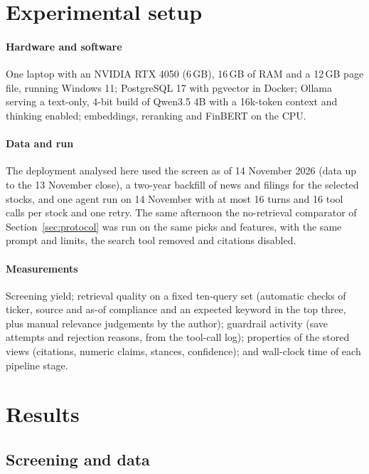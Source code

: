 \documentclass[preprint,11pt]{elsarticle}
\begin{document}
\section{Experimental setup}
\label{sec:setup}

\paragraph{Hardware and software} One laptop with an NVIDIA RTX 4050 (6\,GB), 16\,GB of RAM and a 12\,GB page
file, running Windows 11; PostgreSQL 17 with pgvector in Docker; Ollama serving a text-only, 4-bit build of
Qwen3.5 4B with a 16k-token context and thinking enabled; embeddings, reranking and FinBERT on the CPU.

\paragraph{Data and run} The deployment analysed here used the screen as of 14 November 2026 (data up to the
13 November close), a two-year backfill of news and filings for the selected stocks, and one agent run on
14 November with at most 16 turns and 16 tool calls per stock and one retry. The same afternoon the
no-retrieval comparator of Section~\ref{sec:protocol} was run on the same picks and features, with the same
prompt and limits, the search tool removed and citations disabled.

\paragraph{Measurements} Screening yield; retrieval quality on a fixed ten-query set (automatic checks of
ticker, source and as-of compliance and an expected keyword in the top three, plus manual relevance
judgements by the author); guardrail activity (save attempts and rejection reasons, from the tool-call log);
properties of the stored views (citations, numeric claims, stances, confidence); and wall-clock time of each
pipeline stage.

\section{Results}
\label{sec:results}

\subsection{Screening and data}
\end{document}
